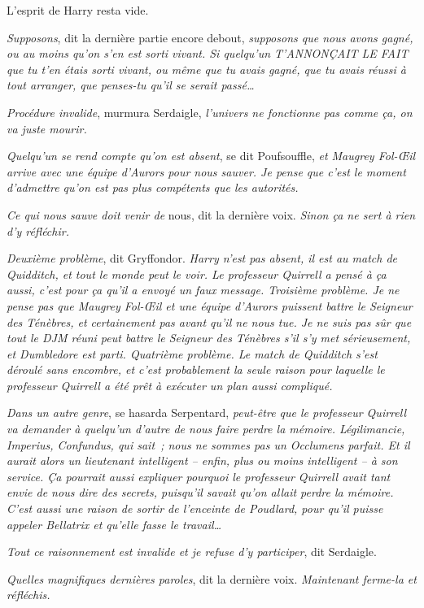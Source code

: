 L'esprit de Harry resta vide.

\emph{Supposons}, dit la dernière partie encore debout, \emph{supposons que nous avons gagné, ou au moins qu'on s'en est sorti vivant.
Si quelqu'un T'ANNONÇAIT LE FAIT que tu t'en étais sorti vivant, ou même que tu avais gagné, que tu avais réussi à tout arranger, que penses-tu qu'il se serait passé…}

\emph{Procédure invalide}, murmura Serdaigle, \emph{l'univers ne fonctionne pas comme ça, on va juste mourir.}

\emph{Quelqu'un se rend compte qu'on est absent}, se dit Poufsouffle, \emph{et Maugrey Fol-Œil arrive avec une équipe d'Aurors pour nous sauver.
Je pense que c'est le moment d'admettre qu'on est pas plus compétents que les autorités.}

\emph{Ce qui nous sauve doit venir de} nous, dit la dernière voix.
\emph{Sinon ça ne sert à rien d'y réfléchir.}

\emph{Deuxième problème}, dit Gryffondor.
\emph{Harry n'est pas absent, il est au match de Quidditch, et tout le monde peut le voir.
Le professeur Quirrell a pensé à ça aussi, c'est pour ça qu'il a envoyé un faux message.
Troisième problème.
Je ne pense pas que Maugrey Fol-Œil et une équipe d'Aurors puissent battre le Seigneur des Ténèbres, et certainement pas avant qu'il ne nous tue.
Je ne suis pas sûr que tout le DJM réuni peut battre le Seigneur des Ténèbres s'il s'y met sérieusement, et Dumbledore est parti.
Quatrième problème.
Le match de Quidditch s'est déroulé sans encombre, et c'est probablement la seule raison pour laquelle le professeur Quirrell a été prêt à exécuter un plan aussi compliqué.}

\emph{Dans un autre genre}, se hasarda Serpentard, \emph{peut-être que le professeur Quirrell va demander à quelqu'un d'autre de nous faire perdre la mémoire.
Légilimancie, Imperius, Confundus, qui sait~; nous ne sommes pas un Occlumens parfait.
Et il aurait alors un lieutenant intelligent -- enfin, plus ou moins intelligent -- à son service.
Ça pourrait aussi expliquer pourquoi le professeur Quirrell avait tant envie de nous dire des secrets, puisqu'il savait qu'on allait perdre la mémoire.
C'est aussi une raison de sortir de l'enceinte de Poudlard, pour qu'il puisse appeler Bellatrix et qu'elle fasse le travail…}

\emph{Tout ce raisonnement est invalide et je refuse d'y participer}, dit Serdaigle.

\emph{Quelles magnifiques dernières paroles}, dit la dernière voix.
\emph{Maintenant ferme-la et réfléchis.}

